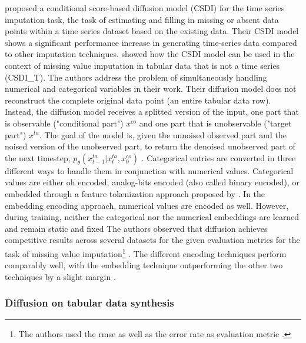 \textcite{tashiro2021CSDIConditionalScorebased} proposed a conditional score-based diffusion model (CSDI) for the time series imputation task, \ie the task of estimating and filling in missing or absent data points within a time series dataset based on the existing data.
Their CSDI model shows a significant performance increase in generating time-series data compared to other imputation techniques.
\cite{zheng2022DiffusionModelsMissing} showed how the CSDI model can be used in the context of missing value imputation in tabular data that is not a time series (CSDI\_T).
The authors address the problem of simultaneously handling numerical and categorical variables in their work.
Their diffusion model does not reconstruct the complete original data point (\eg an entire tabular data row). 
Instead, the diffusion model receives a splitted version of the input, one part that is observable ("conditional part") $x^{co}$ and one part that is unobservable ("target part") $x^{ta}$.
The goal of the model is, given the unnoised observed part and the noised version of the unobserved part, to return the denoised unobserved part of the next timestep, 
\ie $p_\theta(x^{ta}_{t-1}|x^{ta}_{t},x^{co}_{0})$ \cite{zheng2022DiffusionModelsMissing}.
Categorical entries are converted in three different ways to handle them in conjunction with numerical values.
Categorical values are either \gls{oh} encoded, analog-bits encoded (also called binary encoded), or embedded through a feature tokenization approach proposed by \cite{gorishniy2021RevisitingDeepLearning}.
In the embedding encoding approach, numerical values are encoded as well. 
However, during training, neither the categorical nor the numerical embeddings are learned and remain static and fixed \cite{zheng2023DiffusionModelsMissing}
The authors observed that diffusion achieves competitive results across several datasets for the given evaluation metrics for the task of missing value imputation\footnote{The authors used the \gls{rmse} as well as the error rate as evaluation metric \cite[p. 2]{zheng2023DiffusionModelsMissing}.} \cite{zheng2022DiffusionModelsMissing}.
The different encoding techniques perform comparably well, with the embedding technique outperforming the other two techniques by a slight margin \cite{zheng2022DiffusionModelsMissing}.


\subsubsection{Diffusion on tabular data synthesis}
\label{ch:relatedWork-diffusionModels-tabDDPM}

